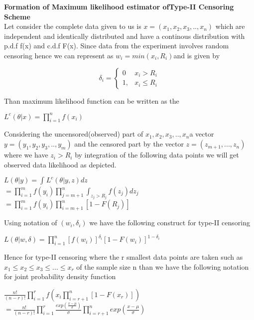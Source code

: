 \documentclass[12pt]{article}
\begin{document}
  
 
\newpage
\textbf{Formation of Maximum likelihood estimator ofType-II Censoring Scheme}\\
Let consider the complete data given to us is $x=(x_{1},x_{2},x_{3},..,x_{n})$ which are independent and identically distributed and have a continous distribution with 
p.d.f f(x) and c.d.f F(x). Since data from the experiment involves random censoring hence we can represent as $w_{i}=min(x_{i},R_{i})$and is given by
\begin{center}
	\[
	\delta_{i}= 
	\begin{cases}
	0      & x_{i}>R_{i}\\
	1,         & x_{i}\leq R_{i} 
	\end{cases}
	\] 
\end{center}

Than maximum likelihood function can be written as the 
\begin{center}
	$L^{c}(\theta|x)=\prod_{i=1}^{n} f(x_{i})$
\end{center}

Considering the uncensored(observed) part of $x_{1},x_{2},x_{3},..,x_{n} $a vector $y=(y_{1},y_{2},y_{3},..,y_{m})$ and the censored part by the vector $z=(z_{m+1},...,z_{n})$ where we have $z_{i}>R_{i}$ by integration of the following data points we will get observed data likelihood as depicted.\\ 
\begin{center}
	$L(\theta|y)=\int_{}^{} L^{c}(\theta|y,z) dz$\\
	$=\prod_{i=1}^{m}f(y_{i}) \prod_{j=m+1}^{n} \int_{z_{j}>R_{j}}^{} f(z_{j})dz_{j}$\\
	$=\prod_{i=1}^{m} f(y_{i}) \prod_{i=m+1}^{n}[1-F(R_{j})]$\\
\begin{flushleft}
	Using notation of $(w_{i},\delta_{i})$ we have the following construct for type-II censoring
\end{flushleft}
$L(\theta|w,\delta)=\prod_{i=1}^{n}[f(w_{i})]^{\delta_{i}}[1-F(w_{i})]^{1-\delta_{i}}$ 
\end{center}
 Hence for type-II censoring where the r smallest data points are taken such as $x_{1}\leq x_{2}\leq x_{3} \leq ...\leq x_{r}$ of the sample size n than we have the following notation for joint probability density function 
 \begin{center}
 	$\frac{n!}{(n-r)!} \prod_{i=1}^{r} f(x_{i} \prod_{i=r+1}^{n}[1-F(x_r)])$\\
 	$=\frac{n!}{(n-r)!} \prod_{i=1}^{r} \frac{exp(\frac{x-\mu}{\sigma})}{\sigma} \prod_{i=r+1}^{n} exp(\frac{x-\mu}{\sigma})$\\
 \end{center}
 
\end{document}
